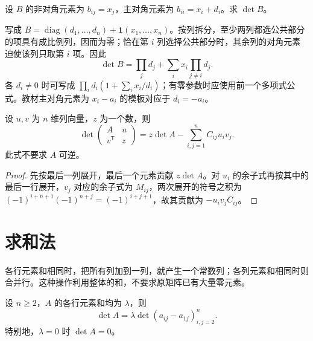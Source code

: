 \begin{example}
\label{ex:xie-ex-det-common-rows}
设 $B$ 的非对角元素为 $b_{ij}=x_j$，主对角元素为 $b_{ii}=x_i+d_i$。求 $\det B$。
\end{example}

\begin{solve}
写成 $B=\operatorname{diag}(d_1,\ldots,d_n)+\mathbf1(x_1,\ldots,x_n)$。按列拆分，至少两列都选公共部分的项具有成比例列，因而为零；恰在第 $i$ 列选择公共部分时，其余列的对角元素迫使该列只取第 $i$ 项。因此
\begin{equation}
\label{eq:xie-ex-det-common-rows}
\det B=\prod_j d_j+\sum_i x_i\prod_{j\ne i}d_j.
\end{equation}
各 $d_i\ne0$ 时可写成 $\prod_i d_i(1+\sum_i x_i/d_i)$；有零参数时应使用前一个多项式公式。教材主对角元素为 $x_i-a_i$ 的模板对应于 $d_i=-a_i$。
\end{solve}

\begin{proposition}[添加一行一列]
\label{prop:xie-ex-det-border}
设 $u,v$ 为 $n$ 维列向量，$z$ 为一个数，则
\begin{equation}
\label{eq:xie-ex-det-border}
\det\begin{pmatrix}A&u\\v^{\mathsf T}&z\end{pmatrix}
=z\det A-\sum_{i,j=1}^{n}C_{ij}u_iv_j.
\end{equation}
此式不要求 $A$ 可逆。
\end{proposition}

\begin{proof}
先按最后一列展开，最后一个元素贡献 $z\det A$。对 $u_i$ 的余子式再按其中的最后一行展开，$v_j$ 对应的余子式为 $M_{ij}$，两次展开的符号之积为 $(-1)^{i+n+1}(-1)^{n+j}=(-1)^{i+j+1}$，故其贡献为 $-u_iv_jC_{ij}$。
\end{proof}

\section{求和法}
\label{sec:xie-ex-det-summing}

各行元素和相同时，把所有列加到一列，就产生一个常数列；各列元素和相同时则合并行。这种操作利用整体的和，不要求原矩阵已有大量零元素。

\begin{proposition}
\label{prop:xie-ex-det-row-sum}
设 $n\geq2$，$A$ 的各行元素和均为 $\lambda$，则
\begin{equation}
\label{eq:xie-ex-det-row-sum}
\det A=\lambda\det(a_{ij}-a_{1j})_{i,j=2}^{n}.
\end{equation}
特别地，$\lambda=0$ 时 $\det A=0$。
\end{proposition}

